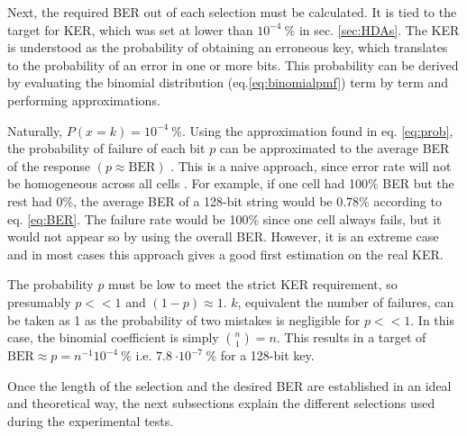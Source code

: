 
Next, the required BER out of each selection must be calculated. It is tied to the target for KER, which was set at lower than $10^{-4} \ \%$ in sec. \ref{sec:HDAs}. The KER is understood as the probability of obtaining an erroneous key, which translates to the probability of an error in one or more bits. This probability can be derived by evaluating the binomial distribution (eq.\ref{eq:binomialpmf}) term by term and performing approximations. 



Naturally, $P(x=k)=10^{-4} \ \%$. Using the approximation found in eq. \ref{eq:prob}, the probability of failure of each bit $p$ can be approximated to the average BER of the response $(p\approx \mathrm{BER})$ \cite{Maes2009}. This is a naive approach, since error rate will not be homogeneous across all cells \cite{Delvaux2015}. For example, if one cell had 100\% BER but the rest had 0\%, the average BER of a 128-bit string would be 0.78\% according to eq. \ref{eq:BER}. The failure rate would be 100\% since one cell always fails, but it would not appear so by using the overall BER. However, it is an extreme case and in most cases this approach gives a good first estimation on the real KER. 

The probability $p$ must be low to meet the strict KER requirement, so presumably $p<<1$ and $(1-p)\approx 1$. $k$, equivalent the number of failures, can be taken as 1 as the probability of two mistakes is negligible for $p<<1$. In this case, the binomial coefficient is simply $ \binom{n}{1} = n $. This results in a target  of $\mathrm{BER}\approx p=n^{-1} 10^{-4} \ \%$ i.e. $\SI{7.8}{\cdot 10^{-7}\ \%}$ for a 128-bit key.

Once the length of the selection and the desired BER are established in an ideal and theoretical way, the next subsections explain the different selections used during the experimental tests.

